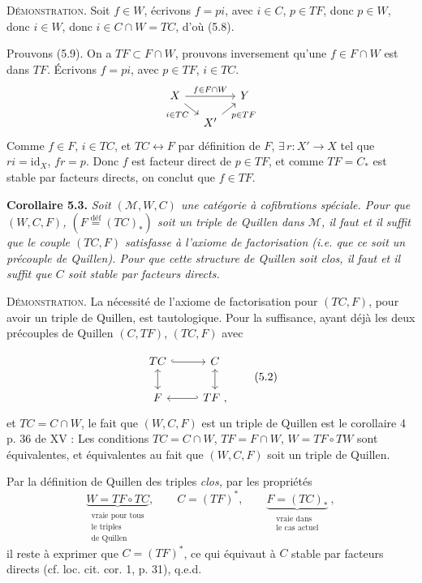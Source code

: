 \documentclass[11pt]{article}
\newcommand{\printedpage}[1]{\marginpar{\footnotesize p.~#1}}
\newcommand{\msp}[1]{\marginpar{\footnotesize [#1]}}
\newcommand{\defeq}{\overset{\text{déf}}{=}}
\begin{document}
\textsc{Démonstration}. Soit $f \in W$, écrivons $f = pi$, avec $i \in C$, $p \in TF$, donc $p \in W$, donc $i \in W$, donc $i \in C \cap W = TC$, d'où (5.8).

Prouvons (5.9). On a $TF \subset F \cap W$, prouvons inversement qu'une $f \in F \cap W$ est dans $TF$. Écrivons $f = pi$, avec $p \in TF$, $i \in TC$.
\[
\begin{tikzcd}[column sep=small, row sep=small]
X \arrow[rr, "f\in F\cap W"] \arrow[dr, "i\in TC"'] & & Y \\
& X' \arrow[ur, "p\in TF"'] &
\end{tikzcd}
\]
Comme $f \in F$, $i \in TC$, et $TC \longleftrightarrow F$ par définition de $F$, $\exists\, r : X' \longrightarrow X$ tel que $ri = \mathrm{id}_X$, $fr = p$. Donc $f$ est facteur direct de $p \in TF$, et comme $TF = C_{*}$ est stable par facteurs directs, on conclut que $f \in TF$.

\textbf{Corollaire 5.3.} \textit{Soit $(\mathcal{M}, W, C)$ une catégorie à cofibrations spéciale. Pour que $(W, C, F)$, $(F \defeq (TC)_{*})$ soit un triple de Quillen dans $\mathcal{M}$, il faut et il suffit que le couple $(TC, F)$ satisfasse à l'axiome de factorisation (i.e. que ce soit un précouple de Quillen). Pour que cette structure de Quillen soit clos, il faut et il suffit que $C$ soit stable par facteurs directs.} %

\msp{page 88}

\textsc{Démonstration}. La nécessité de l'axiome de factorisation pour $(TC, F)$, pour avoir un triple de Quillen, est tautologique. Pour la suffisance, ayant déjà les deux précouples de Quillen $(C, TF)$, $(TC, F)$ avec

\printedpage{44}
\[
\begin{tikzcd}
TC \arrow[r, hook] \arrow[d, leftrightarrow] & C \arrow[d, leftrightarrow] \\
F & TF \arrow[l, hook'] \ ,
\end{tikzcd}
\tag*{(5.2)}
\]
et $TC = C \cap W$, le fait que $(W, C, F)$ est un triple de Quillen est le corollaire 4 p. 36 de XV : Les conditions $TC = C \cap W$, $TF = F \cap W$, $W = TF \circ TW$ sont équivalentes, et équivalentes au fait que $(W, C, F)$ soit un triple de Quillen.

Par la définition de Quillen des triples \textit{clos,} par les propriétés
\[
\underbrace{W = TF \circ TC}_{\substack{\text{vraie pour tous}\\ \text{le triples}\\ \text{de Quillen}}}, \qquad C = (TF)^*, \qquad \underbrace{F = (TC)_*}_{\substack{\text{vraie dans}\\ \text{le cas actuel}}}\ , %
\]
il reste à exprimer que $C = (TF)^*$, ce qui équivaut à $C$ stable par facteurs directs (cf. loc. cit. cor. 1, p. 31), q.e.d.
\end{document}
